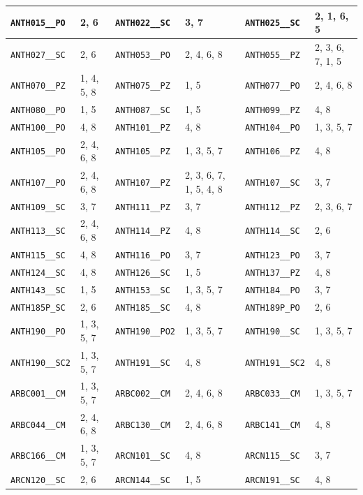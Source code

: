 \begin{longtable}{|l|l||l|l||l|l|}
    \verb|ANTH015__PO| & 2, 6 & \verb|ANTH022__SC| & 3, 7 & \verb|ANTH025__SC| & 2, 1, 6, 5\\\hline
    \verb|ANTH027__SC| & 2, 6 & \verb|ANTH053__PO| & 2, 4, 6, 8 & \verb|ANTH055__PZ| & 2, 3, 6, 7, 1, 5\\\hline
    \verb|ANTH070__PZ| & 1, 4, 5, 8 & \verb|ANTH075__PZ| & 1, 5 & \verb|ANTH077__PO| & 2, 4, 6, 8\\\hline
    \verb|ANTH080__PO| & 1, 5 & \verb|ANTH087__SC| & 1, 5 & \verb|ANTH099__PZ| & 4, 8\\\hline
    \verb|ANTH100__PO| & 4, 8 & \verb|ANTH101__PZ| & 4, 8 & \verb|ANTH104__PO| & 1, 3, 5, 7\\\hline
    \verb|ANTH105__PO| & 2, 4, 6, 8 & \verb|ANTH105__PZ| & 1, 3, 5, 7 & \verb|ANTH106__PZ| & 4, 8\\\hline
    \verb|ANTH107__PO| & 2, 4, 6, 8 & \verb|ANTH107__PZ| & 2, 3, 6, 7, 1, 5, 4, 8 & \verb|ANTH107__SC| & 3, 7\\\hline
    \verb|ANTH109__SC| & 3, 7 & \verb|ANTH111__PZ| & 3, 7 & \verb|ANTH112__PZ| & 2, 3, 6, 7\\\hline
    \verb|ANTH113__SC| & 2, 4, 6, 8 & \verb|ANTH114__PZ| & 4, 8 & \verb|ANTH114__SC| & 2, 6\\\hline
    \verb|ANTH115__SC| & 4, 8 & \verb|ANTH116__PO| & 3, 7 & \verb|ANTH123__PO| & 3, 7\\\hline
    \verb|ANTH124__SC| & 4, 8 & \verb|ANTH126__SC| & 1, 5 & \verb|ANTH137__PZ| & 4, 8\\\hline
    \verb|ANTH143__SC| & 1, 5 & \verb|ANTH153__SC| & 1, 3, 5, 7 & \verb|ANTH184__PO| & 3, 7\\\hline
    \verb|ANTH185P_SC| & 2, 6 & \verb|ANTH185__SC| & 4, 8 & \verb|ANTH189P_PO| & 2, 6\\\hline
    \verb|ANTH190__PO| & 1, 3, 5, 7 & \verb|ANTH190__PO2| & 1, 3, 5, 7 & \verb|ANTH190__SC| & 1, 3, 5, 7\\\hline
    \verb|ANTH190__SC2| & 1, 3, 5, 7 & \verb|ANTH191__SC| & 4, 8 & \verb|ANTH191__SC2| & 4, 8\\\hline
    \verb|ARBC001__CM| & 1, 3, 5, 7 & \verb|ARBC002__CM| & 2, 4, 6, 8 & \verb|ARBC033__CM| & 1, 3, 5, 7\\\hline
    \verb|ARBC044__CM| & 2, 4, 6, 8 & \verb|ARBC130__CM| & 2, 4, 6, 8 & \verb|ARBC141__CM| & 4, 8\\\hline
    \verb|ARBC166__CM| & 1, 3, 5, 7 & \verb|ARCN101__SC| & 4, 8 & \verb|ARCN115__SC| & 3, 7\\\hline
    \verb|ARCN120__SC| & 2, 6 & \verb|ARCN144__SC| & 1, 5 & \verb|ARCN191__SC| & 4, 8\\\hline

\end{longtable}
